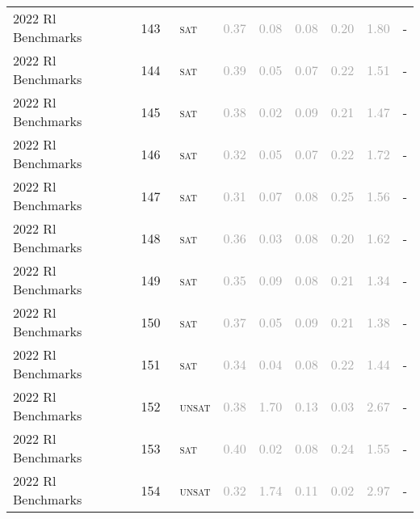 \begin{center}
{\begin{longtable}{@{}lllllllll@{}}
2022 Rl Benchmarks & 143 & ~\textsc{sat} & \textcolor{darkgray}{0.37} & \textcolor{darkgray}{0.08} & \textcolor{darkgray}{0.08} & \textcolor{darkgray}{0.20} & \textcolor{darkgray}{1.80} & - \\
2022 Rl Benchmarks & 144 & ~\textsc{sat} & \textcolor{darkgray}{0.39} & \textcolor{darkgray}{0.05} & \textcolor{darkgray}{0.07} & \textcolor{darkgray}{0.22} & \textcolor{darkgray}{1.51} & - \\
2022 Rl Benchmarks & 145 & ~\textsc{sat} & \textcolor{darkgray}{0.38} & \textcolor{darkgray}{0.02} & \textcolor{darkgray}{0.09} & \textcolor{darkgray}{0.21} & \textcolor{darkgray}{1.47} & - \\
2022 Rl Benchmarks & 146 & ~\textsc{sat} & \textcolor{darkgray}{0.32} & \textcolor{darkgray}{0.05} & \textcolor{darkgray}{0.07} & \textcolor{darkgray}{0.22} & \textcolor{darkgray}{1.72} & - \\
2022 Rl Benchmarks & 147 & ~\textsc{sat} & \textcolor{darkgray}{0.31} & \textcolor{darkgray}{0.07} & \textcolor{darkgray}{0.08} & \textcolor{darkgray}{0.25} & \textcolor{darkgray}{1.56} & - \\
2022 Rl Benchmarks & 148 & ~\textsc{sat} & \textcolor{darkgray}{0.36} & \textcolor{darkgray}{0.03} & \textcolor{darkgray}{0.08} & \textcolor{darkgray}{0.20} & \textcolor{darkgray}{1.62} & - \\
2022 Rl Benchmarks & 149 & ~\textsc{sat} & \textcolor{darkgray}{0.35} & \textcolor{darkgray}{0.09} & \textcolor{darkgray}{0.08} & \textcolor{darkgray}{0.21} & \textcolor{darkgray}{1.34} & - \\
2022 Rl Benchmarks & 150 & ~\textsc{sat} & \textcolor{darkgray}{0.37} & \textcolor{darkgray}{0.05} & \textcolor{darkgray}{0.09} & \textcolor{darkgray}{0.21} & \textcolor{darkgray}{1.38} & - \\
2022 Rl Benchmarks & 151 & ~\textsc{sat} & \textcolor{darkgray}{0.34} & \textcolor{darkgray}{0.04} & \textcolor{darkgray}{0.08} & \textcolor{darkgray}{0.22} & \textcolor{darkgray}{1.44} & - \\
2022 Rl Benchmarks & 152 & ~\textsc{unsat} & \textcolor{darkgray}{0.38} & \textcolor{darkgray}{1.70} & \textcolor{darkgray}{0.13} & \textcolor{darkgray}{0.03} & \textcolor{darkgray}{2.67} & - \\
2022 Rl Benchmarks & 153 & ~\textsc{sat} & \textcolor{darkgray}{0.40} & \textcolor{darkgray}{0.02} & \textcolor{darkgray}{0.08} & \textcolor{darkgray}{0.24} & \textcolor{darkgray}{1.55} & - \\
2022 Rl Benchmarks & 154 & ~\textsc{unsat} & \textcolor{darkgray}{0.32} & \textcolor{darkgray}{1.74} & \textcolor{darkgray}{0.11} & \textcolor{darkgray}{0.02} & \textcolor{darkgray}{2.97} & - \\

\end{longtable}}
\end{center}
